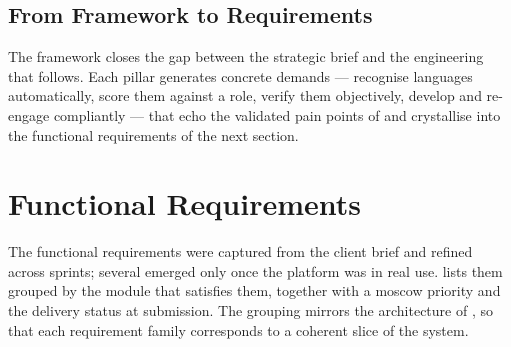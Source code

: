 \subsection{From Framework to Requirements}
\label{sec:framework-bridge}

The framework closes the gap between the strategic brief and the engineering
that follows. Each pillar generates concrete demands --- recognise languages
automatically, score them against a role, verify them objectively, develop
and re-engage compliantly --- that echo the validated pain points of
 and crystallise into the functional requirements
of the next section.


\section{Functional Requirements}
\label{sec:analysis-fr}

The functional requirements were captured from the client brief and refined
across sprints; several emerged only once the platform was in real use.
 lists them grouped by the module
that satisfies them, together with a \gls{moscow} priority and the delivery
status at submission. The grouping mirrors the architecture of
, so that each requirement family corresponds to a
coherent slice of the system.

